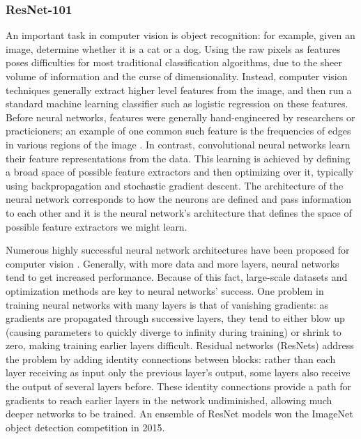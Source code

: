 \documentclass[sigconf]{acmart}
\begin{document}
\subsubsection{ResNet-101}

An important task in computer vision is object recognition: for example, given an image, determine whether it is a cat or a dog. Using the raw pixels as features poses difficulties for most traditional classification algorithms, due to the sheer volume of information and the curse of dimensionality. Instead, computer vision techniques generally extract higher level features from the image, and then run a standard machine learning classifier such as logistic regression on these features. Before neural networks, features were generally hand-engineered by researchers or practicioners; an example of one common such feature is the frequencies of edges in various regions of the image \cite{Dalal2005HOG}. In contrast, convolutional neural networks learn their feature representations from the data. This learning is achieved by defining a broad space of possible feature extractors and then optimizing over it, typically using backpropagation and stochastic gradient descent. The architecture of the neural network corresponds to how the neurons are defined and pass information to each other and it is the neural network's architecture that defines the space of possible feature extractors we might learn.

Numerous highly successful neural network architectures have been proposed for computer vision \cite{Krizhevsky2012ImageNetCW,Szegedy2015,resnet}. Generally, with more data and more layers, neural networks tend to get increased performance. Because of this fact, large-scale datasets and optimization methods are key to neural networks' success. One problem in training neural networks with many layers is that of vanishing gradients: as gradients are propagated through successive layers, they tend to either blow up (causing parameters to quickly diverge to infinity during training) or shrink to zero, making training earlier layers difficult. Residual networks (ResNets) \cite{resnet} address the problem by adding identity connections between blocks: rather than each layer receiving as input only the previous layer's output, some layers also receive the output of several layers before. 
These identity connections provide a path for gradients to reach earlier layers in the network undiminished, allowing much deeper networks to be trained. 
An ensemble of ResNet models won the ImageNet object detection competition in 2015. 
\end{document}
